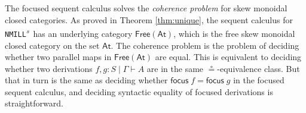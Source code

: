 \documentclass[submission,copyright,creativecommons]{eptcs}
\theoremstyle{definition}
\newcommand{\NMILL}{\texttt{NMILL}}
\newcommand{\SkNMILL}{\NMILL\textsuperscript{\textit{s}}}
\newcommand{\FSkMCC}{\mathsf{Free}}
\begin{document}
The focused sequent calculus solves the \emph{coherence problem} for skew monoidal closed categories.
As proved in Theorem \ref{thm:unique}, the sequent calculus for \SkNMILL\ has an underlying category $\FSkMCC(\mathsf{At})$, which is the free skew monoidal closed category on the set $\mathsf{At}$. The coherence problem is the problem of deciding whether two parallel maps in $\FSkMCC(\mathsf{At})$ are equal. %
This is equivalent to deciding whether two derivations $f,g : S \mid \Gamma \vdash A$ are in the same $\circeq$-equivalence class. But that in turn is the same as deciding whether $\mathsf{focus}\;f = \mathsf{focus}\;g$ in the focused sequent calculus, and deciding syntactic equality of focused derivations is straightforward.


\end{document}
